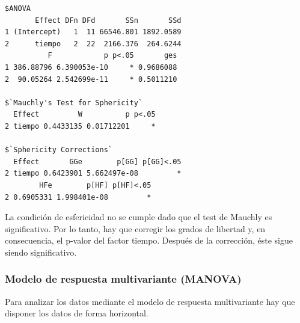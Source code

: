 \documentclass[
]{book}
\newenvironment{Shaded}{\begin{snugshade}}{\end{snugshade}}
\newcommand{\AttributeTok}[1]{\textcolor[rgb]{0.77,0.63,0.00}{#1}}
\newcommand{\ConstantTok}[1]{\textcolor[rgb]{0.00,0.00,0.00}{#1}}
\newcommand{\FunctionTok}[1]{\textcolor[rgb]{0.00,0.00,0.00}{#1}}
\newcommand{\NormalTok}[1]{#1}
\newcommand{\OtherTok}[1]{\textcolor[rgb]{0.56,0.35,0.01}{#1}}
\newcommand{\SpecialCharTok}[1]{\textcolor[rgb]{0.00,0.00,0.00}{#1}}
\begin{document}
\begin{Shaded}
\end{Shaded}

\begin{verbatim}
$ANOVA
       Effect DFn DFd       SSn       SSd
1 (Intercept)   1  11 66546.801 1892.0589
2      tiempo   2  22  2166.376  264.6244
          F            p p<.05       ges
1 386.88796 6.390053e-10     * 0.9686088
2  90.05264 2.542699e-11     * 0.5011210

$`Mauchly's Test for Sphericity`
  Effect         W          p p<.05
2 tiempo 0.4433135 0.01712201     *

$`Sphericity Corrections`
  Effect       GGe        p[GG] p[GG]<.05
2 tiempo 0.6423901 5.662497e-08         *
        HFe        p[HF] p[HF]<.05
2 0.6905331 1.998401e-08         *
\end{verbatim}

La condición de esfericidad no se cumple dado que el test de Mauchly es significativo. Por lo tanto, hay que corregir los grados de libertad y, en consecuencia, el p-valor del factor tiempo. Después de la corrección, éste sigue siendo significativo.

\hypertarget{modelo-de-respuesta-multivariante-manova}{%
\subsubsection{Modelo de respuesta multivariante (MANOVA)}\label{modelo-de-respuesta-multivariante-manova}}

Para analizar los datos mediante el modelo de respuesta multivariante hay que disponer los datos de forma horizontal.
\end{document}
